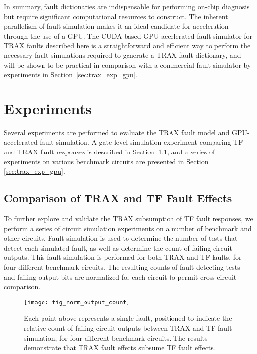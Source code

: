 In summary, fault dictionaries are indispensable for performing on-chip diagnosis but require significant computational resources to construct.
%
The inherent parallelism of fault simulation makes it an ideal candidate for acceleration through the use of a GPU.
%
The CUDA-based GPU-accelerated fault simulator for TRAX faults described here is a straightforward and efficient way to perform the necessary fault simulations required to generate a TRAX fault dictionary, and will be shown to be practical in comparison with a commercial fault simulator by experiments in Section~\ref{sec:trax_exp_gpu}.


\section{Experiments}
\label{trax_exp}

Several experiments are performed to evaluate the TRAX fault model and GPU-accelerated fault simulation.
%
A gate-level simulation experiment comparing TF and TRAX fault responses is described in Section~\ref{sec:trax_exp_fault_effects}, and a series of experiments on various benchmark circuits are presented in Section \ref{sec:trax_exp_gpu}.

\subsection{Comparison of TRAX and TF Fault Effects}
\label{sec:trax_exp_fault_effects}

To further explore and validate the TRAX subsumption of TF fault responses, we perform a series of circuit simulation experiments on a number of benchmark and other circuits.
%
Fault simulation is used to determine the number of tests that detect each simulated fault, as well as determine the count of failing circuit outputs.
%
This fault simulation is performed for both TRAX and TF faults, for four different benchmark circuits.
%
The resulting counts of fault detecting tests and failing output bits are normalized for each circuit to permit cross-circuit comparison.

\begin{figure}[hbtp]
\centering
\texttt{[image: fig\_norm\_output\_count]}
\caption{Each point above represents a single fault, positioned to indicate the relative count of failing circuit outputs between TRAX and TF fault simulation, for four different benchmark circuits.
%
The results demonstrate that TRAX fault effects subsume TF fault effects.}
\label{fig:norm_output_count}
\end{figure}

